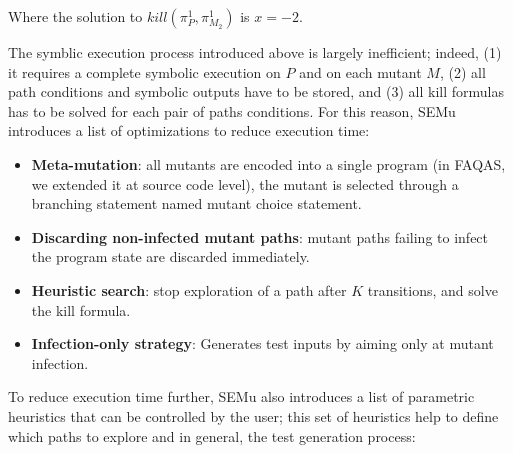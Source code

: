 Where the solution to $kill(\pi_{P}^{1}, \pi_{M_2}^{1})$ is $x = -2$.

The symblic execution process introduced above is largely inefficient; indeed,
(1) it requires a complete symbolic execution on $P$ and on each mutant $M$, (2) all path conditions and symbolic outputs have to be stored, and (3) all kill formulas has to be solved for each pair of paths conditions. 
For this reason, SEMu introduces a list of optimizations to reduce execution time:

\begin{itemize}
	\item \textbf{Meta-mutation}: all mutants are encoded into a single program (in FAQAS, we extended it at source code level), the mutant is selected through a branching statement named mutant choice statement.
	\item \textbf{Discarding non-infected mutant paths}: mutant paths failing to infect the program state are discarded immediately.
	\item \textbf{Heuristic search}: stop exploration of a path after $K$ transitions, and solve the kill formula.
	\item \textbf{Infection-only strategy}: Generates test inputs by aiming only at mutant infection.
\end{itemize}

To reduce execution time further, SEMu also introduces a list of parametric heuristics that can be controlled by the user; this set of heuristics help to define which paths to explore and in general, the test generation process:

